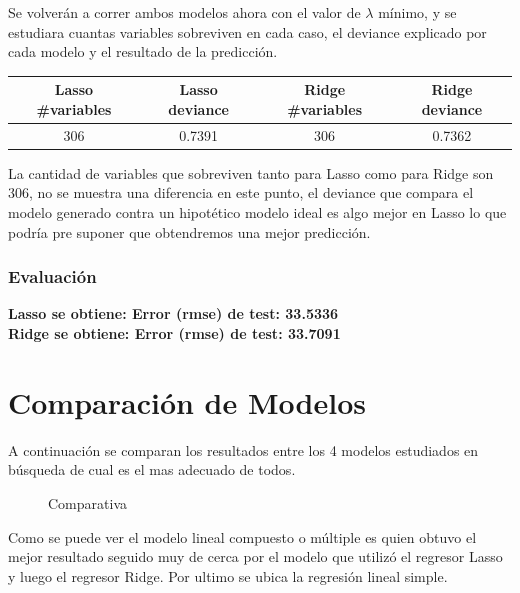 Se volverán a correr ambos modelos ahora con el valor de $\lambda$ mínimo, y se estudiara cuantas variables sobreviven en cada caso, el deviance \cite{modelos} explicado por cada modelo y el resultado de la predicción.


\begin{center}
 \begin{tabular}{||c c c c||} 
 \hline
    Lasso \#variables & Lasso deviance & Ridge \#variables & Ridge deviance  \\ 
 \hline
    306 & 0.7391 & 306 & 0.7362\\
 \hline
 \hline
\end{tabular}
\end{center}



La cantidad de variables que sobreviven tanto para Lasso como para Ridge son 306, no se muestra una diferencia en este punto, el deviance que compara el modelo generado contra un hipotético modelo ideal es algo mejor en Lasso lo que podría pre suponer que obtendremos una mejor predicción.\\


\subsubsection{Evaluación}

\textbf{Lasso se obtiene: Error (rmse) de test: 33.5336}\\
\textbf{Ridge se obtiene: Error (rmse) de test: 33.7091} \\






\newpage
\section{Comparación de Modelos}

A continuación se comparan los resultados entre los 4 modelos estudiados en búsqueda de cual es el mas adecuado de todos.

\begin{figure}[h]
\centering
{}%
\caption{Comparativa}
\label{comparativa}
\end{figure}


Como se puede ver el modelo lineal compuesto o múltiple es quien obtuvo el mejor resultado seguido muy de cerca por el modelo que utilizó el regresor Lasso y luego el regresor Ridge. Por ultimo se ubica la regresión lineal simple. 





